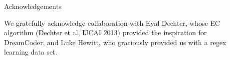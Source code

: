 \documentclass[final]{beamer}
\newlength{\sepwid}
\newlength{\onecolwid}
\newlength{\threecolwid}
\begin{document}
\begin{frame}[t]
\begin{columns}[t]
\begin{column}{\threecolwid}
\begin{columns}[t,totalwidth=\threecolwid]
\begin{column}{\onecolwid}

\begin{block}{Acknowledgements}

  We gratefully acknowledge collaboration with Eyal Dechter, whose EC algorithm (Dechter et al, IJCAI 2013) provided the inspiration for DreamCoder, and Luke Hewitt, who graciously provided us with
  a regex learning data set.

\end{block}



\end{column}

\end{columns} %

\end{column} %

\begin{column}{\sepwid}\end{column} %














\end{columns}
\end{frame}
\end{document}
